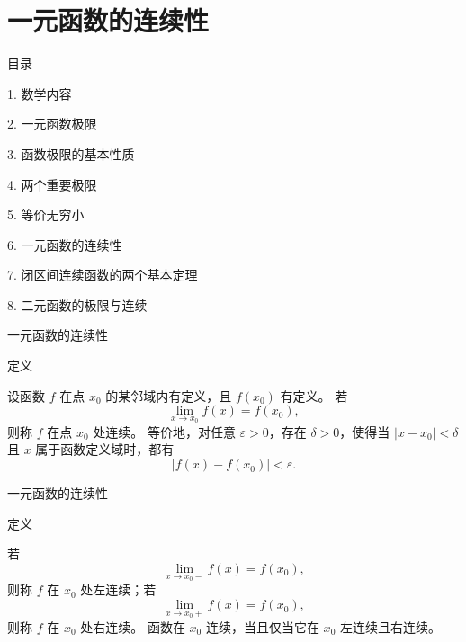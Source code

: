 \documentclass[aspectratio=169,10pt,fontset=fandol]{ctexbeamer}
\begin{document}
\section{一元函数的连续性}
\begin{frame}[t,fragile]{目录}
\normalsize
{\color{black}\normalsize 1. 数学内容\par}\vspace{0.3em}
{\color{black}\normalsize 2. 一元函数极限\par}\vspace{0.3em}
{\color{black}\normalsize 3. 函数极限的基本性质\par}\vspace{0.3em}
{\color{black}\normalsize 4. 两个重要极限\par}\vspace{0.3em}
{\color{black}\normalsize 5. 等价无穷小\par}\vspace{0.3em}
{\color{blue}\normalsize 6. 一元函数的连续性\par}\vspace{0.3em}
{\color{gray!40}\normalsize 7. 闭区间连续函数的两个基本定理\par}\vspace{0.3em}
{\color{gray!40}\normalsize 8. 二元函数的极限与连续\par}\vspace{0.3em}
\end{frame}
\begin{frame}[t,fragile]{一元函数的连续性}
\normalsize
\begin{block}{定义}
{\normalsize

设函数 $f$ 在点 $x_0$ 的某邻域内有定义，且 $f(x_0)$ 有定义。 若
\[
\lim_{x\to x_0}f(x)=f(x_0),
\]
则称 $f$ 在点 $x_0$ 处连续。 等价地，对任意 $\varepsilon>0$，存在 $\delta>0$，使得当 $|x-x_0|<\delta$ 且 $x$ 属于函数定义域时，都有
\[
|f(x)-f(x_0)|<\varepsilon.
\]

}
\end{block}
\end{frame}
\begin{frame}[t,fragile]{一元函数的连续性}
\normalsize
\begin{block}{定义}
{\normalsize

若
\[
\lim_{x\to x_0-}f(x)=f(x_0),
\]
则称 $f$ 在 $x_0$ 处左连续；若
\[
\lim_{x\to x_0+}f(x)=f(x_0),
\]
则称 $f$ 在 $x_0$ 处右连续。 函数在 $x_0$ 连续，当且仅当它在 $x_0$ 左连续且右连续。

}
\end{block}
\end{frame}
\end{document}
